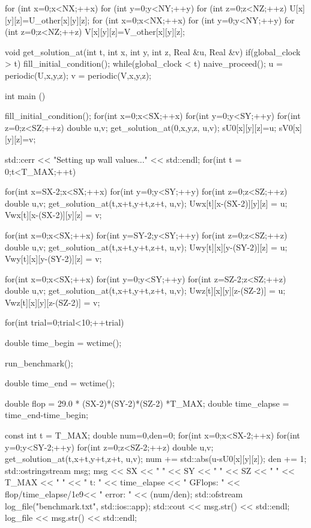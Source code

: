 \begin{code}
{  for (int x=0;x<NX;++x) {
    for (int y=0;y<NY;++y) {
      for (int z=0;z<NZ;++z) {
        U[x][y][z]=U_other[x][y][z];
      }
    }
  }
  for (int x=0;x<NX;++x) {
    for (int y=0;y<NY;++y) {
      for (int z=0;z<NZ;++z) {
        V[x][y][z]=V_other[x][y][z];
      }
    }
  }
}

void get_solution_at(int t, int x, int y, int z, Real &u, Real &v) {
  if(global_clock > t) fill_initial_condition();
  while(global_clock < t) naive_proceed();
  u = periodic(U,x,y,z);
  v = periodic(V,x,y,z);
}

int main () {

  fill_initial_condition();
  for(int x=0;x<SX;++x) {
    for(int y=0;y<SY;++y) {
      for(int z=0;z<SZ;++z) {
        double u,v; get_solution_at(0,x,y,z, u,v);
        sU0[x][y][z]=u;
        sV0[x][y][z]=v;
      }
    }
  }

  std::cerr << "Setting up wall values..." << std::endl;
  for(int t = 0;t<T_MAX;++t){
    for(int x=SX-2;x<SX;++x) {
      for(int y=0;y<SY;++y) {
        for(int z=0;z<SZ;++z) {
          double u,v; get_solution_at(t,x+t,y+t,z+t, u,v);
          Uwx[t][x-(SX-2)][y][z] = u;
          Vwx[t][x-(SX-2)][y][z] = v;
        }
      }
    }

    for(int x=0;x<SX;++x) {
      for(int y=SY-2;y<SY;++y) {
        for(int z=0;z<SZ;++z) {
          double u,v; get_solution_at(t,x+t,y+t,z+t, u,v);
          Uwy[t][x][y-(SY-2)][z] = u;
          Vwy[t][x][y-(SY-2)][z] = v;
        }
      }
    }

    for(int x=0;x<SX;++x) {
      for(int y=0;y<SY;++y) {
        for(int z=SZ-2;z<SZ;++z) {
          double u,v; get_solution_at(t,x+t,y+t,z+t, u,v);
          Uwz[t][x][y][z-(SZ-2)] = u;
          Vwz[t][x][y][z-(SZ-2)] = v;
        }
      }
    }
  }


  for(int trial=0;trial<10;++trial) {

    double time_begin = wctime();

    run_benchmark();

    double time_end = wctime();

    double flop = 29.0 * (SX-2)*(SY-2)*(SZ-2) *T_MAX;
    double time_elapse = time_end-time_begin;

    {
      const int t = T_MAX;
      double num=0,den=0;
      for(int x=0;x<SX-2;++x) {
        for(int y=0;y<SY-2;++y) {
          for(int z=0;z<SZ-2;++z) {
            double u,v; get_solution_at(t,x+t,y+t,z+t, u,v);
            num += std::abs(u-sU0[x][y][z]);
            den += 1;
          }
        }
      }
      std::ostringstream msg;
      msg << SX << " " << SY << " " << SZ << " " << T_MAX << " "
          << " t: " << time_elapse << " GFlops: " << flop/time_elapse/1e9<< " error: " << (num/den);
      std::ofstream log_file("benchmark.txt", std::ios::app);
      std::cout << msg.str() << std::endl;
      log_file << msg.str() << std::endl;
    }
  }
}

\end{code}

